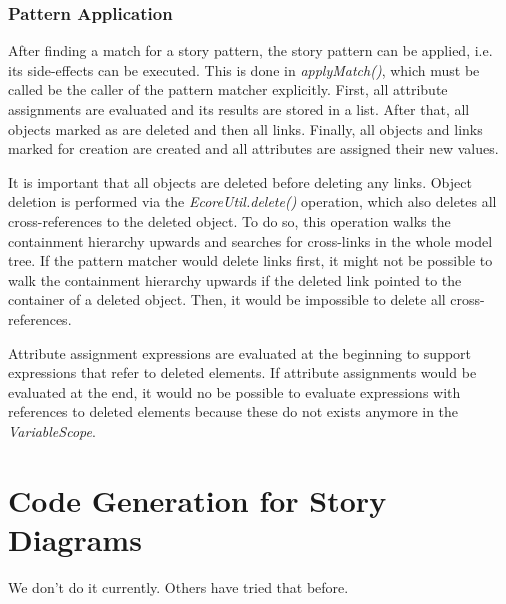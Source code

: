 \subsubsection{Pattern Application}
\label{sec:spm_pattern_application}

After finding a match for a story pattern, the story pattern can be applied, i.e. its side-effects can be executed.
This is done in \emph{applyMatch()}, which must be called be the caller of the pattern matcher explicitly.
First, all attribute assignments are evaluated and its results are stored in a list.
After that, all objects marked as \destroy are deleted and then all links.
Finally, all objects and links marked for creation are created and all attributes are assigned their new values.

It is important that all objects are deleted before deleting any links.
Object deletion is performed via the \emph{EcoreUtil.delete()} operation, which also deletes all cross-references to the deleted object.
To do so, this operation walks the containment hierarchy upwards and searches for cross-links in the whole model tree.
If the pattern matcher would delete links first, it might not be possible to walk the containment hierarchy upwards if the deleted link pointed to the container of a deleted object.
Then, it would be impossible to delete all cross-references.

Attribute assignment expressions are evaluated at the beginning to support expressions that refer to deleted elements. 
If attribute assignments would be evaluated at the end, it would no be possible to evaluate expressions with references to deleted elements because these do not exists anymore in the \emph{VariableScope}.





\section{Code Generation for Story Diagrams}
 We don't do it currently. Others have tried that before.\cite{GBD07}
